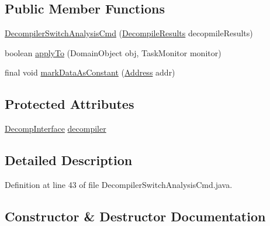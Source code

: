 \subsection*{Public Member Functions}
\begin{DoxyCompactItemize}
\item 
\mbox{\hyperlink{classghidra_1_1app_1_1cmd_1_1function_1_1_decompiler_switch_analysis_cmd_a8c60d71a59700b68bd3ffb2960208ce6}{Decompiler\+Switch\+Analysis\+Cmd}} (\mbox{\hyperlink{classghidra_1_1app_1_1decompiler_1_1_decompile_results}{Decompile\+Results}} decopmile\+Results)
\item 
boolean \mbox{\hyperlink{classghidra_1_1app_1_1cmd_1_1function_1_1_decompiler_switch_analysis_cmd_aa1850c989d5d7025bfa8e3eaeaeac440}{apply\+To}} (Domain\+Object obj, Task\+Monitor monitor)
\item 
final void \mbox{\hyperlink{classghidra_1_1app_1_1cmd_1_1function_1_1_decompiler_switch_analysis_cmd_aa0ca0c7c8f64f75c895be701209fc1fd}{mark\+Data\+As\+Constant}} (\mbox{\hyperlink{class_address}{Address}} addr)
\end{DoxyCompactItemize}
\subsection*{Protected Attributes}
\begin{DoxyCompactItemize}
\item 
\mbox{\hyperlink{classghidra_1_1app_1_1decompiler_1_1_decomp_interface}{Decomp\+Interface}} \mbox{\hyperlink{classghidra_1_1app_1_1cmd_1_1function_1_1_decompiler_switch_analysis_cmd_a00027bad760619ae566f463a55a1cefd}{decompiler}}
\end{DoxyCompactItemize}


\subsection{Detailed Description}


Definition at line 43 of file Decompiler\+Switch\+Analysis\+Cmd.\+java.



\subsection{Constructor \& Destructor Documentation}
\mbox{\label{classghidra_1_1app_1_1cmd_1_1function_1_1_decompiler_switch_analysis_cmd_a8c60d71a59700b68bd3ffb2960208ce6}} 
